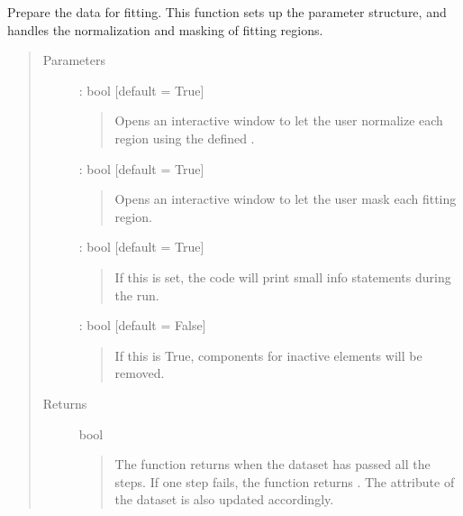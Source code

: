 \documentclass[letterpaper,10pt,english]{sphinxmanual}
\begin{document}
\begin{fulllineitems}
\begin{fulllineitems}
\end{fulllineitems}


\begin{fulllineitems}
\label{\detokenize{api:VoigtFit.DataSet.prepare_dataset}}
Prepare the data for fitting. This function sets up the parameter structure,
and handles the normalization and masking of fitting regions.
\begin{quote}\begin{description}
\item[{Parameters}] \leavevmode
{} : bool   {[}default = True{]}
\begin{quote}

Opens an interactive window to let the user normalize each region
using the defined .
\end{quote}

 : bool   {[}default = True{]}
\begin{quote}

Opens an interactive window to let the user mask each fitting region.
\end{quote}

 : bool   {[}default = True{]}
\begin{quote}

If this is set, the code will print small info statements during the run.
\end{quote}

 : bool   {[}default = False{]}
\begin{quote}

If this is True, components for inactive elements will be removed.
\end{quote}

\item[{Returns}] \leavevmode
bool
\begin{quote}

The function returns  when the dataset has passed all the steps.
If one step fails, the function returns .
The  attribute of the dataset is also
updated accordingly.
\end{quote}


\end{description}
\end{quote}
\end{fulllineitems}
\end{fulllineitems}
\end{document}
